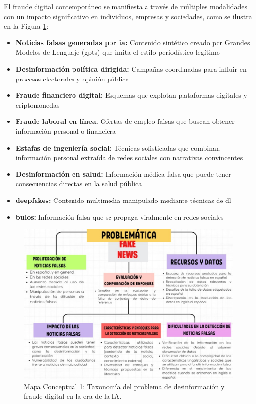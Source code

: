 El fraude digital contemporáneo se manifiesta a través de múltiples modalidades con un impacto significativo en individuos, empresas y sociedades, como se ilustra en la Figura \ref{fig:mapa_problema}:

\begin{itemize}
    \item \textbf{Noticias falsas generadas por \gls{ia}:} Contenido sintético creado por Grandes Modelos de Lenguaje (\glspl{gpt}) que imita el estilo periodístico legítimo \cite{su2023fake}
    \item \textbf{Desinformación política dirigida:} Campañas coordinadas para influir en procesos electorales y opinión pública \cite{carcamo2021fake}
    \item \textbf{Fraude financiero digital:} Esquemas que explotan plataformas digitales y criptomonedas \cite{cao2020corporate}
    \item \textbf{Fraude laboral en línea:} Ofertas de empleo falsas que buscan obtener información personal o financiera \cite{nasser2021online}
    \item \textbf{Estafas de ingeniería social:} Técnicas sofisticadas que combinan información personal extraída de redes sociales con narrativas convincentes
    \item \textbf{Desinformación en salud:} Información médica falsa que puede tener consecuencias directas en la salud pública \cite{pulido2020new}
    \item \textbf{\Glspl{deepfake}:} Contenido multimedia manipulado mediante técnicas de \gls{dl}
    \item \textbf{\Glspl{bulo}:} Información falsa que se propaga viralmente en redes sociales
\end{itemize}

\begin{figure}[h!]
    \centering
    \includegraphics[width=\textwidth]{Imagenes/mapaConceptual1.png}
    \caption{Mapa Conceptual 1: Taxonomía del problema de desinformación y fraude digital en la era de la IA.}
    \label{fig:mapa_problema}
\end{figure}

